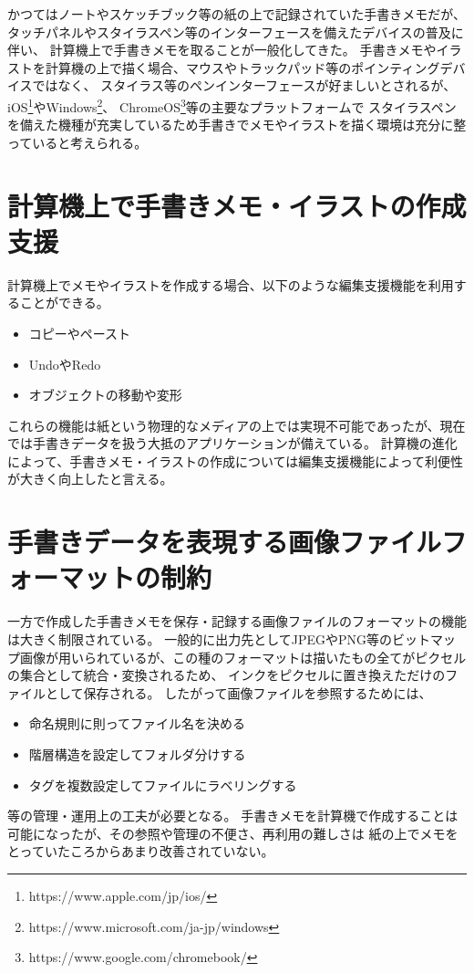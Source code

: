 かつてはノートやスケッチブック等の紙の上で記録されていた手書きメモだが、タッチパネルやスタイラスペン等のインターフェースを備えたデバイスの普及に伴い、
計算機上で手書きメモを取ることが一般化してきた。
手書きメモやイラストを計算機の上で描く場合、マウスやトラックパッド等のポインティングデバイスではなく、
スタイラス等のペンインターフェースが好ましいとされるが、iOS\footnote{https://www.apple.com/jp/ios/}やWindows\footnote{https://www.microsoft.com/ja-jp/windows}、
ChromeOS\footnote{https://www.google.com/chromebook/}等の主要なプラットフォームで
スタイラスペンを備えた機種が充実しているため手書きでメモやイラストを描く環境は充分に整っていると考えられる。

\section{計算機上で手書きメモ・イラストの作成支援}
計算機上でメモやイラストを作成する場合、以下のような編集支援機能を利用することができる。
\begin{itemize}
    \item コピーやペースト
    \item UndoやRedo
    \item オブジェクトの移動や変形
\end{itemize}
これらの機能は紙という物理的なメディアの上では実現不可能であったが、現在では手書きデータを扱う大抵のアプリケーションが備えている。
計算機の進化によって、手書きメモ・イラストの作成については編集支援機能によって利便性が大きく向上したと言える。

\section{手書きデータを表現する画像ファイルフォーマットの制約}
一方で作成した手書きメモを保存・記録する画像ファイルのフォーマットの機能は大きく制限されている。
一般的に出力先としてJPEGやPNG等のビットマップ画像が用いられているが、この種のフォーマットは描いたもの全てがピクセルの集合として統合・変換されるため、
インクをピクセルに置き換えただけのファイルとして保存される。
したがって画像ファイルを参照するためには、
\begin{itemize}
    \item 命名規則に則ってファイル名を決める
    \item 階層構造を設定してフォルダ分けする
    \item タグを複数設定してファイルにラベリングする
\end{itemize}
等の管理・運用上の工夫が必要となる。
手書きメモを計算機で作成することは可能になったが、その参照や管理の不便さ、再利用の難しさは
紙の上でメモをとっていたころからあまり改善されていない。


